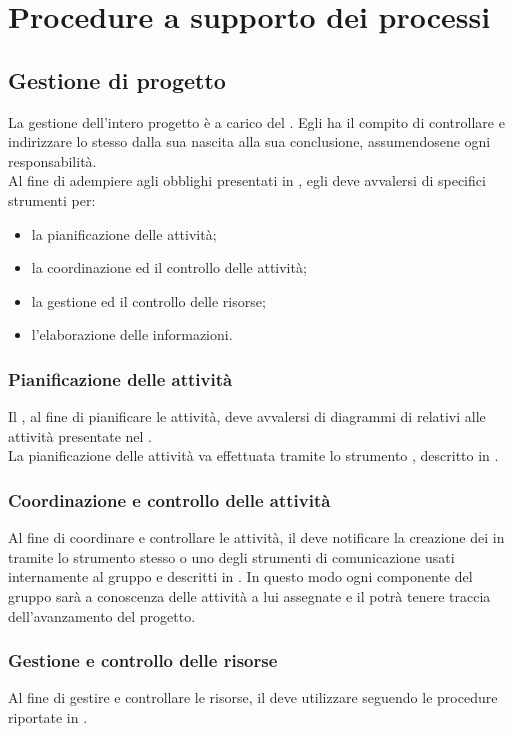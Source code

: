 \section{Procedure a supporto dei processi}
\subsection{Gestione di progetto}
La gestione dell'intero progetto è a carico del \Responsabile. Egli ha il compito di controllare e indirizzare lo stesso dalla sua nascita alla sua conclusione, assumendosene ogni responsabilità.\\
Al fine di adempiere agli obblighi presentati in , egli deve avvalersi di specifici strumenti per:
\begin{itemize}
	\item la pianificazione delle attività;
	\item la coordinazione ed il controllo delle attività;
	\item la gestione ed il controllo delle risorse;
	\item l'elaborazione delle informazioni.
\end{itemize}

\subsubsection{Pianificazione delle attività}
Il \Responsabile, al fine di pianificare le attività, deve avvalersi di diagrammi di  relativi alle attività presentate nel \PianoDiProgetto.\\
La pianificazione delle attività va effettuata tramite lo strumento , descritto in .

\subsubsection{Coordinazione e controllo delle attività}
Al fine di coordinare e controllare le attività, il \Responsabile{} deve notificare la creazione dei  in  tramite lo strumento stesso o uno degli strumenti di comunicazione usati internamente al gruppo e descritti in . In questo modo ogni componente del gruppo sarà a conoscenza delle attività a lui assegnate e il \Responsabile{} potrà tenere traccia dell'avanzamento del progetto.

\subsubsection{Gestione e controllo delle risorse}
Al fine di gestire e controllare le risorse, il \Responsabile{} deve utilizzare  seguendo le procedure riportate in .

